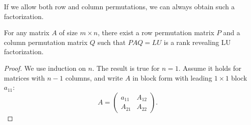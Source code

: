 \documentclass[final]{siamart1116}
\numberwithin{theorem}{section}
\newcommand{\by}{\times}
\begin{document}
If we allow both row and column permutations, we can always obtain such a factorization.

\begin{theorem}\label{thm:row_column_permutation}
  For any matrix $A$ of size $m \by n$, there exist a row permutation matrix $P$ and a column permutation matrix $Q$ such that $PAQ = LU$ is a rank revealing LU factorization.
\end{theorem}

\begin{proof}
  We use induction on $n$. The result is true for $n=1$. Assume it holds for matrices with $n-1$ columns, and write $A$ in block form with leading $1 \times 1$ block $a_{11}$:
  \[
    A =
    \begin{pmatrix}
      a_{11} & A_{12} \\
      A_{21} & A_{22}
    \end{pmatrix}.
  \]


\end{proof}
\end{document}
